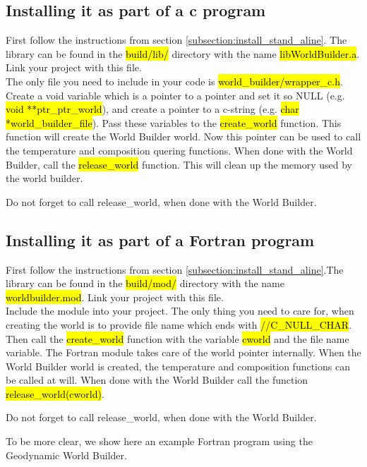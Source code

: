 \documentclass{book}
\newcommand{\GWB}{{Geodynamic World Builder}}
\newcommand{\WB}{{World Builder}}
\begin{document}
\subsection{Installing it as part of a c program}
First follow the instructions from section \ref{subsection:install_stand_aline}. The library can be found in the \hl{build/lib/} directory with the name \hl{libWorldBuilder.a}. Link your project with this file. 
\\
The only file you need to include in your code is \hl{world\_builder/wrapper\_c.h}. Create a void variable which is a pointer to a pointer and set it so NULL (e.g. \hl{void **ptr\_ptr\_world}), and create a pointer to a c-string (e.g. \hl{char *world\_builder\_file}). Pass these variables to the \hl{create\_world} function. This function will create the \WB{} world. Now this pointer can be used to call the temperature and composition quering functions. When done with the \WB{}, call the \hl{release\_world} function. This will clean up the memory used by the world builder.
\begin{remark}
Do not forget to call release\_world, when done with the \WB{}.
\end{remark}

\subsection{Installing it as part of a Fortran program}
First follow the instructions from section \ref{subsection:install_stand_aline}.The library can be found in the \hl{build/mod/} directory with the name \hl{worldbuilder.mod}. Link your project with this file. 
\\
Include the module into your project. The only thing you need to care for, when creating the world is to provide file name which ends with \hl{//C\_NULL\_CHAR}. Then call the \hl{create\_world} function with the variable \hl{cworld} and the file name variable. The Fortran module takes care of the world pointer internally. When the \WB{} world is created, the temperature and composition functions can be called at will. When done with the \WB{} call the function \hl{release\_world(cworld)}. 
\begin{remark}
Do not forget to call release\_world, when done with the \WB{}.
\end{remark}
To be more clear, we show here an example Fortran program using the \GWB{}. 
\end{document}
